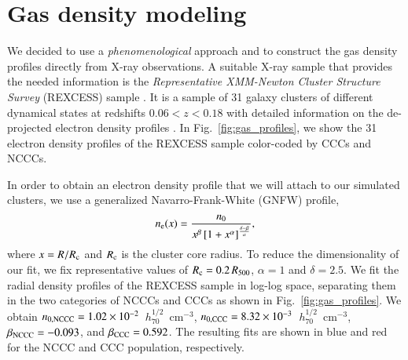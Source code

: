 \documentclass[useAMS,usenatbib]{mn2e}
\begin{document}
\section{Gas density modeling}
\label{sec:3}

We decided to use a \emph{phenomenological} approach and to construct the gas
density profiles directly from X-ray observations. A suitable X-ray sample that
provides the needed information is the \emph{Representative XMM-Newton Cluster
  Structure Survey} (REXCESS) sample \citep{2008A&A...487..431C,
  2009A&A...498..361P}. It is a sample of 31 galaxy clusters of different
dynamical states at redshifts $0.06<z<0.18$ with detailed information on the
de-projected electron density profiles \citep{2008A&A...487..431C}. In
Fig.~\ref{fig:gas_profiles}, we show the 31 electron density profiles of the
REXCESS sample color-coded by CCCs and NCCCs.

In order to obtain an electron density profile that we will attach to our
simulated clusters, we use a generalized Navarro-Frank-White (GNFW) profile,
\begin{equation}
n_{{\mathrm{e}}}(x) = \frac{n_{0}}{x^{\beta}\left[1+x^{\alpha}\right]^{\frac{\delta-\beta}{\alpha}}},
\label{eq:gnfw}
\end{equation}
where $x=R/R_{{\mathrm{c}}}$ and $R_{{\mathrm{c}}}$ is the cluster core radius. To reduce
the dimensionality of our fit, we fix representative values of $R_{{\mathrm{c}}} =
0.2\, R_{500}$, $\alpha = 1$ and $\delta = 2.5$. We fit the radial density
profiles of the REXCESS sample in log-log space, separating them in the two
categories of NCCCs and CCCs as shown in Fig.~\ref{fig:gas_profiles}.  We
obtain $n_{{\mathrm{0,NCCC}}} = 1.02\times10^{-2}$~$h_{70}^{1/2}$~cm$^{-3}$,
$n_{{\mathrm{0,CCC}}} = 8.32\times10^{-3}$~$h_{70}^{1/2}$~cm$^{-3}$,
$\beta_{{\mathrm{NCCC}}} = -0.093$, and $\beta_{{\mathrm{CCC}}} = 0.592$. The resulting
fits are shown in blue and red for the NCCC and CCC population, respectively.
\end{document}
